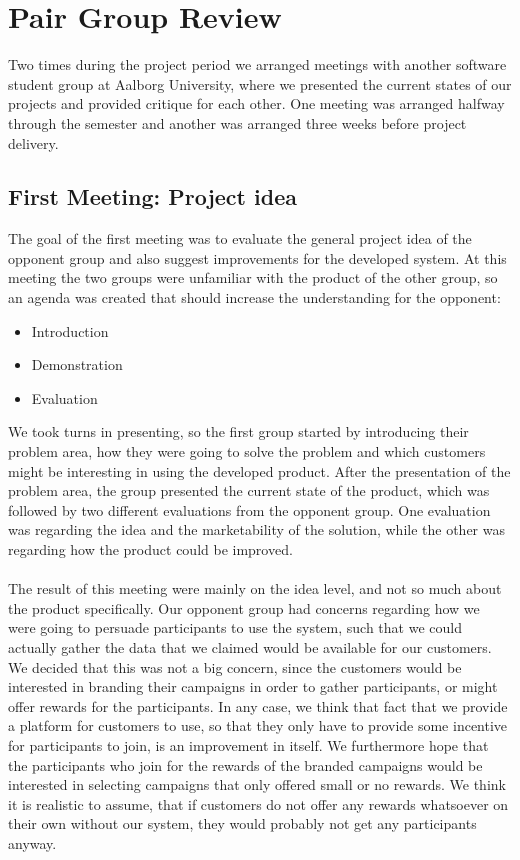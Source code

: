 \section{Pair Group Review}
\label{sec:pair_group_review}

Two times during the project period we arranged meetings with another software student group at Aalborg University, where we presented the current states of our projects and provided critique for each other. One meeting was arranged halfway through the semester and another was arranged three weeks before project delivery. 

\subsection{First Meeting: Project idea}
\label{sub:first_meeting_project_idea}
The goal of the first meeting was to evaluate the general project idea of the opponent group and also suggest improvements for the developed system. At this meeting the two groups were unfamiliar with the product of the other group, so an agenda was created that should increase the understanding for the opponent:

\begin{itemize}
    \item Introduction
    \item Demonstration
    \item Evaluation
\end{itemize}

We took turns in presenting, so the first group started by introducing their problem area, how they were going to solve the problem and which customers might be interesting in using the developed product. After the presentation of the problem area, the group presented the current state of the product, which was followed by two different evaluations from the opponent group. One evaluation was regarding the idea and the marketability of the solution, while the other was regarding how the product could be improved. 
\\\\
The result of this meeting were mainly on the idea level, and not so much about the product specifically. Our opponent group had concerns regarding how we were going to persuade participants to use the system, such that we could actually gather the data that we claimed would be available for our customers. We decided that this was not a big concern, since the customers would be interested in branding their campaigns in order to gather participants, or might offer rewards for the participants. In any case, we think that fact that we provide a platform for customers to use, so that they only have to provide some incentive for participants to join, is an improvement in itself. We furthermore hope that the participants who join for the rewards of the branded campaigns would be interested in selecting campaigns that only offered small or no rewards. We think it is realistic to assume, that if customers do not offer any rewards whatsoever on their own without our system, they would probably not get any participants anyway. 


